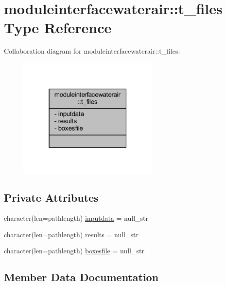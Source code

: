 \hypertarget{structmoduleinterfacewaterair_1_1t__files}{}\section{moduleinterfacewaterair\+:\+:t\+\_\+files Type Reference}
\label{structmoduleinterfacewaterair_1_1t__files}


Collaboration diagram for moduleinterfacewaterair\+:\+:t\+\_\+files\+:\nopagebreak
\begin{figure}[H]
\begin{center}
\leavevmode
\includegraphics[width=199pt]{structmoduleinterfacewaterair_1_1t__files__coll__graph}
\end{center}
\end{figure}
\subsection*{Private Attributes}
\begin{DoxyCompactItemize}
\item 
character(len=pathlength) \mbox{\hyperlink{structmoduleinterfacewaterair_1_1t__files_a2ee2285ed1037804550ee3649588e5de}{inputdata}} = null\+\_\+str
\item 
character(len=pathlength) \mbox{\hyperlink{structmoduleinterfacewaterair_1_1t__files_a388d456b957a91401d1033128a4db0dc}{results}} = null\+\_\+str
\item 
character(len=pathlength) \mbox{\hyperlink{structmoduleinterfacewaterair_1_1t__files_a4d92a9aae2aea845d88938a0e5e4e3c3}{boxesfile}} = null\+\_\+str
\end{DoxyCompactItemize}


\subsection{Member Data Documentation}
\mbox{\label{structmoduleinterfacewaterair_1_1t__files_a4d92a9aae2aea845d88938a0e5e4e3c3}} 
